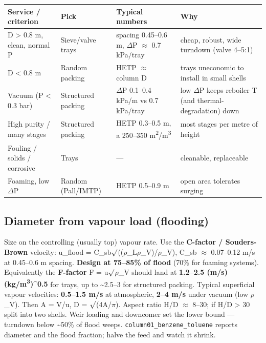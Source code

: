 \documentclass[11pt,a4paper]{article}
\begin{document}
\begin{longtable}[]{@{}>{\raggedright\arraybackslash}p{\dimexpr(\linewidth-8\tabcolsep)/4\relax}>{\raggedright\arraybackslash}p{\dimexpr(\linewidth-8\tabcolsep)/4\relax}>{\raggedright\arraybackslash}p{\dimexpr(\linewidth-8\tabcolsep)/4\relax}>{\raggedright\arraybackslash}p{\dimexpr(\linewidth-8\tabcolsep)/4\relax}@{}}
\toprule\noalign{}
Service / criterion & Pick & Typical numbers & Why \\
\midrule\noalign{}
\endhead
\bottomrule\noalign{}
\endlastfoot
D \textgreater{} 0.8 m, clean, normal P & Sieve/valve trays & spacing
0.45--0.6 m, \(\Delta\)P \(\approx\) 0.7 kPa/tray & cheap, robust, wide turndown (valve
4--5:1) \\
D \textless{} 0.8 m & Random packing & HETP \(\approx\) column D & trays
uneconomic to install in small shells \\
Vacuum (P \textless{} 0.3 bar) & Structured packing & \(\Delta\)P 0.1--0.4 kPa/m
vs 0.7 kPa/tray & low \(\Delta\)P keeps reboiler T (and thermal-degradation)
down \\
High purity / many stages & Structured packing & HETP 0.3--0.5 m, a
250--350 m\textsuperscript{2}/m\textsuperscript{3} & most stages per metre of height \\
Fouling / solids / corrosive & Trays & --- & cleanable, replaceable \\
Foaming, low \(\Delta\)P & Random (Pall/IMTP) & HETP 0.5--0.9 m & open area
tolerates surging \\
\end{longtable}

\hypertarget{diameter-from-vapour-load-flooding}{%
\subsection{Diameter from vapour load
(flooding)}\label{diameter-from-vapour-load-flooding}}

Size on the controlling (usually top) vapour rate. Use the
\textbf{C-factor / Souders-Brown} velocity: u\_flood =
C\_sb\textperiodcentered{}\(\surd\)((\(\rho\)\_L\textminus{}\(\rho\)\_V)/\(\rho\)\_V), C\_sb \(\approx\) 0.07--0.12 m/s at 0.45--0.6 m
spacing. \textbf{Design at 75--85\% of flood} (70\% for foaming
systems). Equivalently the \textbf{F-factor} F = u\textperiodcentered{}\(\surd\)\(\rho\)\_V should land at
\textbf{1.2--2.5 (m/s)(kg/m\textsuperscript{3})\^{}0.5} for trays, up to
\textasciitilde2.5--3 for structured packing. Typical superficial vapour
velocities: \textbf{0.5--1.5 m/s} at atmospheric, \textbf{2--4 m/s}
under vacuum (low \(\rho\)\_V). Then A = V/u, D = \(\surd\)(4A/\(\pi\)). Aspect ratio H/D \(\approx\)
8--30; if H/D \textgreater{} 30 split into two shells. Weir loading and
downcomer set the lower bound --- turndown below \textasciitilde50\% of
flood weeps. \texttt{column01\_benzene\_toluene} reports diameter and
the flood fraction; halve the feed and watch it shrink.
\end{document}
